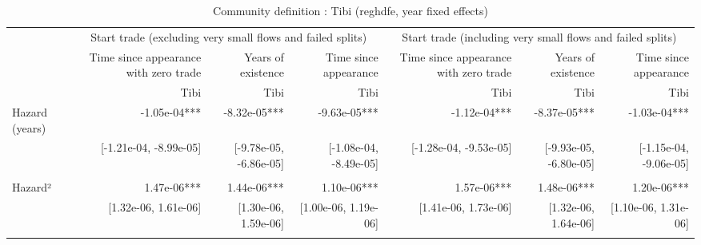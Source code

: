 \begin{table}[!h]
\caption{Community definition : Tibi (reghdfe, year fixed effects)}
\centering
\begin{tabular}{lllllll}
\cline{1-7}
\multicolumn{1}{c}{} &
  \multicolumn{3}{|c}{Start trade (excluding very small flows and failed splits)} &
  \multicolumn{3}{c}{Start trade (including very small flows and failed splits)} \\
\multicolumn{1}{c}{} &
  \multicolumn{1}{|r}{Time since appearance with zero trade} &
  \multicolumn{1}{r}{Years of existence} &
  \multicolumn{1}{r}{Time since appearance} &
  \multicolumn{1}{r}{Time since appearance with zero trade} &
  \multicolumn{1}{r}{Years of existence} &
  \multicolumn{1}{r}{Time since appearance} \\
\multicolumn{1}{c}{} &
  \multicolumn{1}{|r}{Tibi} &
  \multicolumn{1}{r}{Tibi} &
  \multicolumn{1}{r}{Tibi} &
  \multicolumn{1}{r}{Tibi} &
  \multicolumn{1}{r}{Tibi} &
  \multicolumn{1}{r}{Tibi} \\
\cline{1-7}
\multicolumn{1}{l}{Hazard (years)} &
  \multicolumn{1}{|r}{-1.05e-04***} &
  \multicolumn{1}{r}{-8.32e-05***} &
  \multicolumn{1}{r}{-9.63e-05***} &
  \multicolumn{1}{r}{-1.12e-04***} &
  \multicolumn{1}{r}{-8.37e-05***} &
  \multicolumn{1}{r}{-1.03e-04***} \\
\multicolumn{1}{l}{} &
  \multicolumn{1}{|r}{[-1.21e-04, -8.99e-05]} &
  \multicolumn{1}{r}{[-9.78e-05, -6.86e-05]} &
  \multicolumn{1}{r}{[-1.08e-04, -8.49e-05]} &
  \multicolumn{1}{r}{[-1.28e-04, -9.53e-05]} &
  \multicolumn{1}{r}{[-9.93e-05, -6.80e-05]} &
  \multicolumn{1}{r}{[-1.15e-04, -9.06e-05]} \\
\multicolumn{1}{l}{} &
  \multicolumn{1}{|r}{} &
  \multicolumn{1}{r}{} &
  \multicolumn{1}{r}{} &
  \multicolumn{1}{r}{} &
  \multicolumn{1}{r}{} &
  \multicolumn{1}{r}{} \\
\multicolumn{1}{l}{Hazard²} &
  \multicolumn{1}{|r}{1.47e-06***} &
  \multicolumn{1}{r}{1.44e-06***} &
  \multicolumn{1}{r}{1.10e-06***} &
  \multicolumn{1}{r}{1.57e-06***} &
  \multicolumn{1}{r}{1.48e-06***} &
  \multicolumn{1}{r}{1.20e-06***} \\
\multicolumn{1}{l}{} &
  \multicolumn{1}{|r}{[1.32e-06,  1.61e-06]} &
  \multicolumn{1}{r}{[1.30e-06,  1.59e-06]} &
  \multicolumn{1}{r}{[1.00e-06,  1.19e-06]} &
  \multicolumn{1}{r}{[1.41e-06,  1.73e-06]} &
  \multicolumn{1}{r}{[1.32e-06,  1.64e-06]} &
  \multicolumn{1}{r}{[1.10e-06,  1.31e-06]} \\
\multicolumn{1}{l}{} &
  \multicolumn{1}{|r}{} &

\end{tabular}
\end{table}

